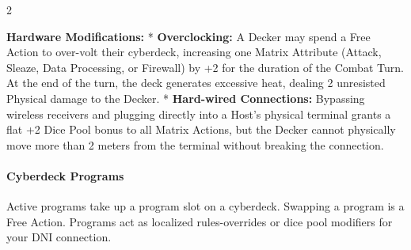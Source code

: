 \documentclass[
  oneside]{article}
\begin{document}
\begin{multicols}{2}

\textbf{Hardware Modifications:} *
\textbf{Overclocking:} A Decker may spend a Free
Action to over-volt their cyberdeck, increasing
one Matrix Attribute (Attack, Sleaze, Data
Processing, or Firewall) by +2 for the duration of
the Combat Turn. At the end of the turn, the deck
generates excessive heat, dealing 2 unresisted
Physical damage to the Decker. *
\textbf{Hard-wired Connections:} Bypassing
wireless receivers and plugging directly into a
Host's physical terminal grants a flat +2 Dice
Pool bonus to all Matrix Actions, but the Decker
cannot physically move more than 2 meters from the
terminal without breaking the connection.

\hypertarget{cyberdeck-programs}{%
\paragraph{Cyberdeck
Programs}\label{cyberdeck-programs}}

Active programs take up a program slot on a
cyberdeck. Swapping a program is a Free Action.
Programs act as localized rules-overrides or dice
pool modifiers for your DNI connection.

\end{multicols}
\end{document}

